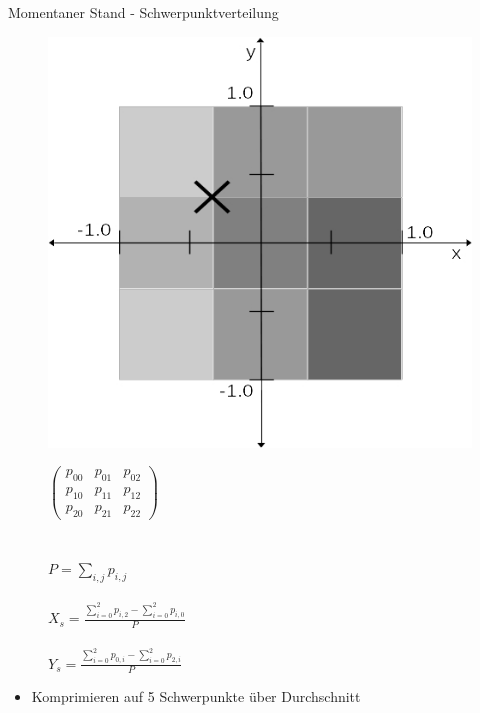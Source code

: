 \documentclass[10pt]{beamer}
\begin{document}
\begin{frame}{Momentaner Stand - Schwerpunktverteilung}
\begin{figure}
    \begin{minipage}[c]{0.5\linewidth}
        \includegraphics[width=\linewidth]{schwerpunkt_ansatz.jpg}
    \end{minipage}
    \hfill
    \begin{minipage}[c]{0.3\linewidth}
        $\begin{pmatrix}
            p_{00} & p_{01} & p_{02}\\
            p_{10} & p_{11} & p_{12}\\
            p_{20} & p_{21} & p_{22}
        \end{pmatrix}$
        \\\\\\
        $P = \sum_{i,j} p_{i,j}$
        \\\\
        $X_s = \frac{\sum_{i=0}^{2} p_{i,2} - \sum_{i=0}^{2} p_{i,0}}{P}$
        \\\\
        $Y_s = \frac{\sum_{i=0}^{2} p_{0,i} - \sum_{i=0}^{2} p_{2,i}}{P}$
    \end{minipage}
\end{figure}
\begin{itemize}
    \item Komprimieren auf 5 Schwerpunkte über Durchschnitt
\end{itemize}
\end{frame}
\end{document}

